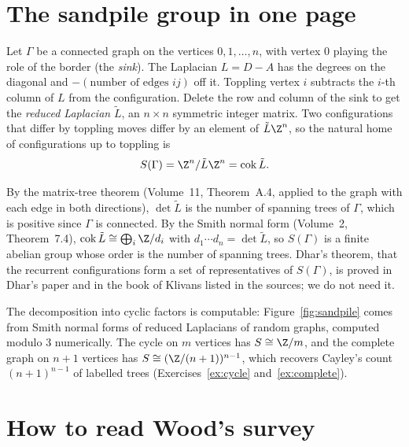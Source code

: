 \section{The sandpile group in one page}

Let $\Gamma$ be a connected graph on the vertices $0,1,\dots,n$, with vertex $0$ playing the role of the border (the \emph{sink}). The Laplacian $L=D-A$ has the degrees on the diagonal and $-(\text{number of edges }ij)$ off it. Toppling vertex $i$ subtracts the $i$-th column of $L$ from the configuration. Delete the row and column of the sink to get the \emph{reduced Laplacian} $\tilde L$, an $n\times n$ symmetric integer matrix. Two configurations that differ by toppling moves differ by an element of $\tilde L\Z^n$, so the natural home of configurations up to toppling is
\[
S(\Gamma)=\Z^n/\tilde L\Z^n=\operatorname{cok}\tilde L.
\]

\begin{remark}\label{rem:sandpilefacts}
By the matrix-tree theorem (Volume~11, Theorem~A.4, applied to the graph with each edge in both directions), $\det\tilde L$ is the number of spanning trees of $\Gamma$, which is positive since $\Gamma$ is connected. By the Smith normal form (Volume~2, Theorem~7.4), $\operatorname{cok}\tilde L\cong\bigoplus_i\Z/d_i$ with $d_1\cdots d_n=\det\tilde L$, so $S(\Gamma)$ is a finite abelian group whose order is the number of spanning trees. Dhar's theorem, that the recurrent configurations form a set of representatives of $S(\Gamma)$, is proved in Dhar's paper and in the book of Klivans listed in the sources; we do not need it.
\end{remark}

The decomposition into cyclic factors is computable: Figure~\ref{fig:sandpile} comes from Smith normal forms of reduced Laplacians of random graphs, computed modulo $3$ numerically. The cycle on $m$ vertices has $S\cong\Z/m$, and the complete graph on $n+1$ vertices has $S\cong(\Z/(n+1))^{n-1}$, which recovers Cayley's count $(n+1)^{n-1}$ of labelled trees (Exercises~\ref{ex:cycle} and~\ref{ex:complete}).

\section{How to read Wood's survey}

